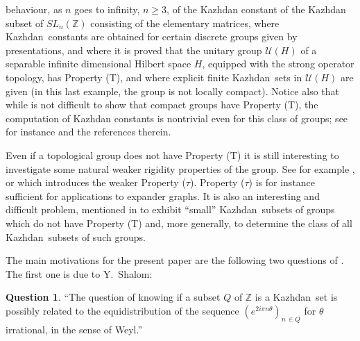 \documentclass[11pt,english,a4paper]{smfart}
\numberwithin{equation}{section}
\theoremstyle{definition}
\newtheorem{question}[theorem]{Question}
\begin{document}
behaviour, as $n$ goes to infinity, $n\ge 3$, of the Kazhdan constant of the 
Kazhdan subset of $SL_{n}({\ensuremath{\mathbb Z}})$ consisting of 
the elementary matrices, \cite{Zuk} where {Kazhdan}\ constants are obtained for 
certain discrete groups given by presentations, and \cite{Be} where it is 
proved that the unitary group ${\mathscr{U}}(H)$ of a separable infinite dimensional 
Hilbert space $H$, equipped with the strong operator topology, has 
Property (T), and where explicit finite {Kazhdan}\ sets in ${\mathscr{U}}(H)$
are given (in this last example, the group is not locally compact). Notice also that while is not difficult to show that compact groups have Property (T), the 
computation of Kazhdan constants is nontrivial even for this class of groups; see for instance 
\cite{Neuh} and the references therein. 
\par\smallskip 
Even if a topological group does not have Property (T) it is still interesting to 
investigate some natural weaker rigidity properties of the group. See
for example \cite{LZ}, or \cite{Lubo94} which introduces the weaker Property ($\tau$). Property ($\tau$) is for instance sufficient for applications to expander graphs. 
It is also an interesting and difficult problem, mentioned in \cite[Sec.~7.12]{BdHV} to exhibit ``small''
{Kazhdan}\ subsets of groups which do not have Property (T) and, more generally, to determine the class of all {Kazhdan}\ subsets of such groups.

\par\smallskip 
The main motivations for the present paper are the following two questions of \cite[Sec.~7.12]{BdHV}. The first one is due to Y.~Shalom: 

\begin{question}\label{Question 0}\cite[Sec.~7.12]{BdHV}
 ``The question of knowing if a subset ${Q}$ of ${\ensuremath{\mathbb Z}}$ is a {Kazhdan}\ set is 
possibly related to the equidistribution of the sequence $(e^{2i\pi 
n\theta 
})_{n\,\in Q}$ for $\theta $ irrational, in the sense of Weyl.''
\end{question}
\end{document}
